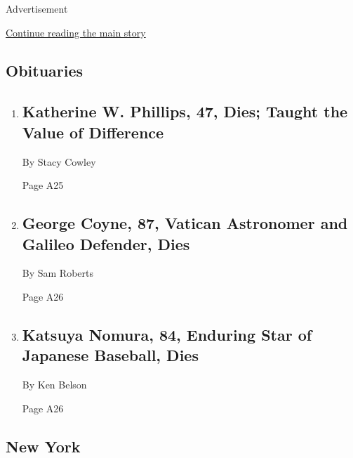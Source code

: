 Advertisement

\protect\hyperlink{after-mid2}{Continue reading the main story}

\hypertarget{obituaries}{%
\subsection{Obituaries}\label{obituaries}}

\begin{enumerate}
\def\labelenumi{\arabic{enumi}.}
\item
  \href{/2020/02/13/business/katherine-w-phillips-dead.html}{}

  \hypertarget{katherine-w-phillips-47-dies-taught-the-value-of-difference}{%
  \subsection{Katherine W. Phillips, 47, Dies; Taught the Value of
  Difference}\label{katherine-w-phillips-47-dies-taught-the-value-of-difference}}

  By Stacy Cowley

  Page A25
\item
  \href{/2020/02/14/science/the-rev-george-c-coyne-dead.html}{}

  \hypertarget{george-coyne-87-vatican-astronomer-and-galileo-defender-dies}{%
  \subsection{George Coyne, 87, Vatican Astronomer and Galileo Defender,
  Dies}\label{george-coyne-87-vatican-astronomer-and-galileo-defender-dies}}

  By Sam Roberts

  Page A26
\item
  \href{/2020/02/13/sports/baseball/katsuya-nomura-dead.html}{}

  \hypertarget{katsuya-nomura-84-enduring-star-of-japanese-baseball-dies}{%
  \subsection{Katsuya Nomura, 84, Enduring Star of Japanese Baseball,
  Dies}\label{katsuya-nomura-84-enduring-star-of-japanese-baseball-dies}}

  By Ken Belson

  Page A26
\end{enumerate}

\hypertarget{new-york}{%
\subsection{New York}\label{new-york}}

